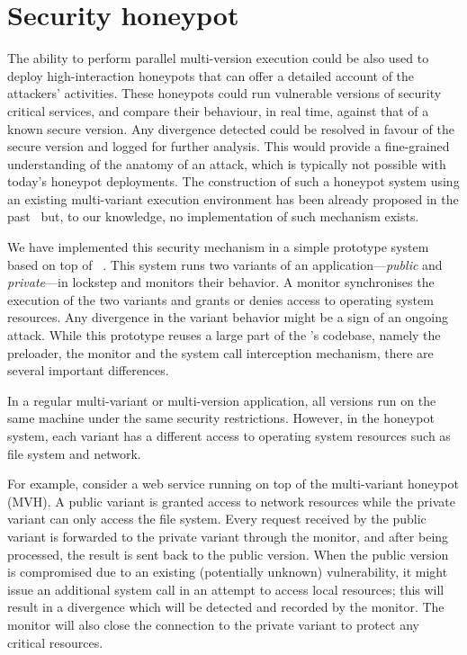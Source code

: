 \section{Security honeypot}
\label{sec:honeypot}

The ability to perform parallel multi-version execution could be also used to
deploy high-interaction honeypots that can offer a detailed account of the
attackers' activities. These honeypots could run vulnerable versions of
security critical services, and compare their behaviour, in real time, against
that of a known secure version.  Any divergence detected could be resolved in
favour of the secure version and logged for further analysis.  This would
provide a fine-grained understanding of the anatomy of an attack, which is
typically not possible with today's honeypot deployments. The construction of
such a honeypot system using an existing multi-variant execution environment
has been already proposed in the past~\cite{jackson10} but, to our knowledge,
no implementation of such mechanism exists.

We have implemented this security mechanism in a simple prototype system based
on top of \varan~\cite{pes:mvh}. This system runs two variants of an
application---\emph{public} and \emph{private}---in lockstep and monitors their
behavior. A monitor synchronises the execution of the two variants and grants
or denies access to operating system resources. Any divergence in the variant
behavior might be a sign of an ongoing attack. While this prototype reuses a
large part of the \varan's codebase, namely the preloader, the monitor and the
system call interception mechanism, there are several important differences.

In a regular multi-variant or multi-version application, all versions run on
the same machine under the same security restrictions.  However, in the
honeypot system, each variant has a different access to operating system
resources such as file system and network.

For example, consider a web service running on top of the multi-variant
honeypot (MVH). A public variant is granted access to network resources while
the private variant can only access the file system. Every request received by
the public variant is forwarded to the private variant through the monitor, and
after being processed, the result is sent back to the public version. When the
public version is compromised due to an existing (potentially unknown)
vulnerability, it might issue an additional system call in an attempt to
access local resources; this will result in a divergence which will be detected
and recorded by the monitor. The monitor will also close the connection to the
private variant to protect any critical resources.

